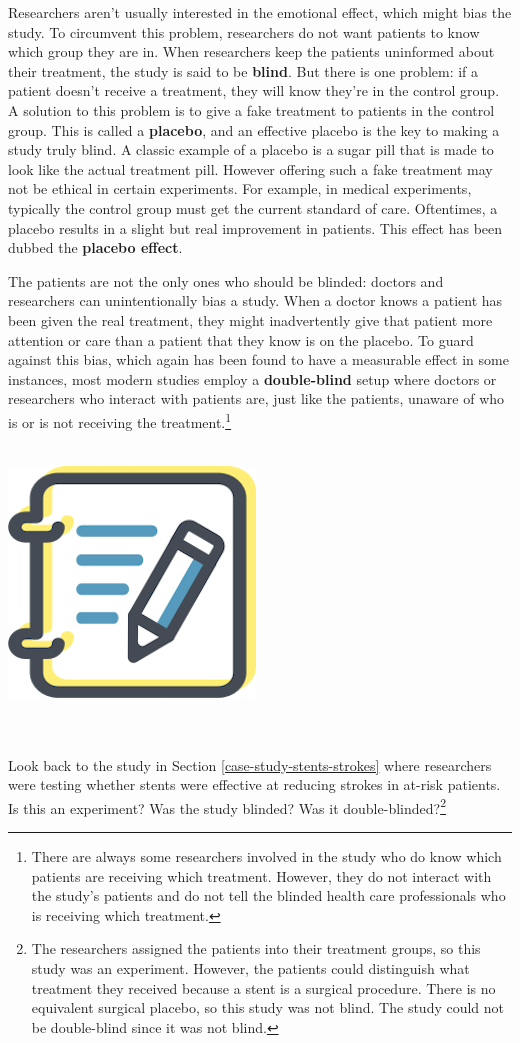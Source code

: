 \documentclass[
  10pt,
  openany]{book}
\newenvironment{mdframedwithfootGPWE}
{   
    \savenotes
    \begin{mdframed}[%
    topline=true, bottomline=true, linecolor=oiB, linewidth=0.5pt,
    rightline=false, leftline=false,
    backgroundcolor=oiLGray]
    \renewcommand{\thempfootnote}{\arabic{footnote}}
    }
{
    \end{mdframed}
    \spewnotes
}
\newenvironment{guidedpractice}{
\vspace{4mm}
\begin{mdframedwithfootGPWE}
\begin{minipage}[t]{0.10\textwidth}
{$\:$ \\ \setkeys{Gin}{width=2.5em,keepaspectratio}\includegraphics{images/_icons/guided-practice.png}}
\end{minipage}
\hfill
\begin{minipage}[t]{0.90\textwidth}
\vspace{-2mm}
\setlength{\parskip}{1em}
\noindent\textbf{\color{oiB}\small\fontfamily{phv}\selectfont{\MakeUppercase{Guided Practice}}} $\:$ \\ \\
}{\end{minipage}
\end{mdframedwithfootGPWE}
\vspace{4mm}
}
\begin{document}
Researchers aren't usually interested in the emotional effect, which might bias the study.
To circumvent this problem, researchers do not want patients to know which group they are in.
When researchers keep the patients uninformed about their treatment, the study is said to be \textbf{blind}.
But there is one problem: if a patient doesn't receive a treatment, they will know they're in the control group.
A solution to this problem is to give a fake treatment to patients in the control group.
This is called a \textbf{placebo}, and an effective placebo is the key to making a study truly blind.
A classic example of a placebo is a sugar pill that is made to look like the actual treatment pill.
However offering such a fake treatment may not be ethical in certain experiments.
For example, in medical experiments, typically the control group must get the current standard of care.
Oftentimes, a placebo results in a slight but real improvement in patients.
This effect has been dubbed the \textbf{placebo effect}.

The patients are not the only ones who should be blinded: doctors and researchers can unintentionally bias a study.
When a doctor knows a patient has been given the real treatment, they might inadvertently give that patient more attention or care than a patient that they know is on the placebo.
To guard against this bias, which again has been found to have a measurable effect in some instances, most modern studies employ a \textbf{double-blind} setup where doctors or researchers who interact with patients are, just like the patients, unaware of who is or is not receiving the treatment.\footnote{There are always some researchers involved in the study who do know which patients are receiving which treatment.
  However, they do not interact with the study's patients and do not tell the blinded health care professionals who is receiving which treatment.}

\begin{guidedpractice}
Look back to the study in Section \ref{case-study-stents-strokes} where researchers were testing whether stents were effective at reducing strokes in at-risk patients.
Is this an experiment?
Was the study blinded?
Was it double-blinded?\footnote{The researchers assigned the patients into their treatment groups, so this study was an experiment.
  However, the patients could distinguish what treatment they received because a stent is a surgical procedure. There is no equivalent surgical placebo, so this study was not blind.
  The study could not be double-blind since it was not blind.}

\end{guidedpractice}
\end{document}

